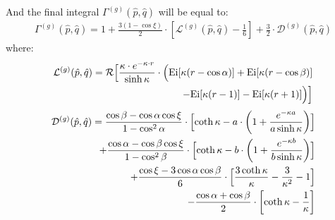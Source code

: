 And the final integral $\Gamma^{(g)}(\hat{p}, \hat{q})$ will be equal to:
\begin{equation}\begin{aligned}
\Gamma^{(g)}(\hat{p}, \hat{q}) = 1 + \frac{3(1 - \cos \xi)}{2} \cdot \left[\mathcal{L}^{(g)}(\hat{p}, \hat{q}) - \frac{1}{6} \right] + \frac{3}{2} \cdot \mathcal{D}^{(g)}(\hat{p}, \hat{q})
\end{aligned}\end{equation}
where:
\begin{equation}\begin{aligned}
\mathcal{L}^{(g)}(\hat{p}, \hat{q}) = \mathcal{R} \Bigl[ \frac{\kappa \cdot e^{-\kappa \cdot r}}{\sinh \kappa} \cdot \Bigl( \text{Ei} [\kappa(r - \cos \alpha)] + \text{Ei}[\kappa(r - \cos \beta)] \\ -  \text{Ei} [\kappa(r - 1)] - \text{Ei}[\kappa(r + 1)] \Bigr) \Bigr]
\end{aligned}\end{equation}
\begin{equation}\begin{aligned}
\mathcal{D}^{(g)}(\hat{p}, \hat{q}) = \frac{\cos \beta - \cos \alpha \cos \xi}{1 - \cos^2 \alpha} \cdot \Bigl[\coth \kappa - a \cdot \left(1 + \frac{e^{-\kappa a}}{a \sinh \kappa}\right) \Bigr] \\ + \frac{\cos \alpha - \cos \beta \cos \xi}{1 - \cos^2 \beta} \cdot \Bigl[\coth \kappa - b \cdot \left(1 + \frac{e^{-\kappa b}}{b \sinh \kappa} \right) \Bigr] \\ + \frac{\cos \xi - 3 \cos \alpha \cos \beta}{6} \cdot \Bigl[\frac{3 \coth \kappa}{\kappa} - \frac{3}{\kappa^2} - 1\Bigr] \\ - \frac{\cos \alpha + \cos \beta}{2} \cdot \left[\coth \kappa - \frac{1}{\kappa}\right]
\end{aligned}\end{equation}

